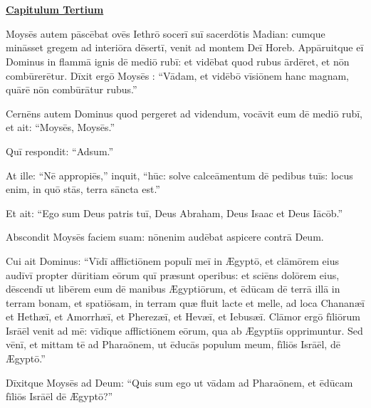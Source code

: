 \chapter{}


{\begin{center}\large\bf\underline{Capitulum Tertium}\end{center}%
\vspace*{-0.75cm}
Moysēs autem pāscēbat ovēs Iethrō socerī suī sacerdōtis Madian:
cumque mināsset gregem ad interiōra dēsertī,
venit ad montem Deī Horeb.
Appāruitque eī Dominus in flammā ignis dē mediō rubī:
et vidēbat quod rubus ārdēret, et nōn combūrerētur.
Dīxit ergō Moysēs : ``Vādam, et vidēbō vīsiōnem hanc magnam, quārē nōn combūrātur rubus.''

Cernēns autem Dominus quod pergeret ad videndum,
vocāvit eum dē mediō rubī, et ait: ``Moysēs, Moysēs.''

Quī respondit: ``Adsum.''

At ille: ``Nē appropiēs,'' inquit, ``hūc: solve calceāmentum dē pedibus tuīs: locus enim,
in quō stās, terra sāncta est.'' 

Et ait: ``Ego sum Deus patris tuī, Deus Abraham, Deus Isaac et Deus Iācōb.''

Abscondit Moysēs faciem suam: nōn\linebreak enim audēbat aspicere contrā Deum.

Cui ait Dominus: ``Vīdī afflīctiōnem populī meī in Ægyptō,
et clāmōrem eius audīvī propter dūritiam eōrum quī præsunt operibus:
et sciēns dolōrem eius, dēscendī ut libērem eum dē manibus Ægyptiōrum,
et ēdūcam dē terrā illā in terram bonam, et spatiōsam,
in terram quæ fluit lacte et melle,
ad loca Chananæī et Hethæī, et Amorrhæī, et Pherezæī, et Hevæī, et Iebusæī.
Clāmor ergō fīliōrum Isrāēl venit ad mē: vīdīque afflīctiōnem eōrum,
qua ab Ægyptiīs opprimuntur.
Sed vēnī, et mittam tē ad Pharaōnem,
ut ēducās populum meum, fīliōs Isrāēl, dē Ægyptō.''

Dīxitque Moysēs ad Deum: ``Quis sum ego ut vādam ad Pharaōnem,
et ēdūcam fīliōs Isrāēl dē Ægyptō?''

}
